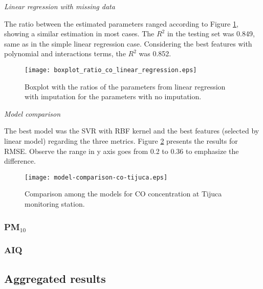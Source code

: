 \vspace{2mm}

{\em Linear regression with missing data} 

\vspace{2mm}

The ratio between the estimated parameters ranged according to Figure
\ref{fig:boxplot-co-linear-regression}, showing a similar estimation in most cases. The $R^2$ in the testing set was
0.849, same as in the simple
linear regression case. Considering the best features with polynomial and
interactions terms, the $R^2$ was 0.852.

\begin{figure}
    \centering
    \texttt{[image: boxplot\_ratio\_co\_linear\_regression.eps]}
    \caption{Boxplot with the ratios of the parameters from linear regression
    with imputation for the parameters with no imputation.}
    \label{fig:boxplot-co-linear-regression}
\end{figure}

\vspace{2mm}

{\em Model comparison} 

\vspace{2mm}

The best model was the SVR with RBF kernel and the best features
(selected by linear model) regarding the three metrics. Figure
\ref{fig:model-comparison-co-tijuca} presents the results for RMSE. Observe
the range in y axis goes from 0.2 to 0.36 to emphasize the difference.

\begin{figure}
    \centering
    \texttt{[image: model-comparison-co-tijuca.eps]}
    \caption{Comparison among the models for CO concentration at Tijuca monitoring station.}
    \label{fig:model-comparison-co-tijuca}
\end{figure}

\subsubsection{PM\texorpdfstring{$_{10}$}{10}}

\subsubsection{AIQ}

\subsection{Aggregated results}

